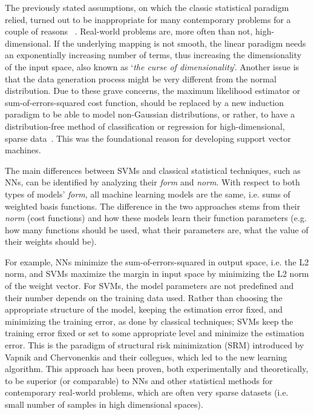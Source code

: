 \documentclass[reqno]{vcuthesis}
\numberwithin{equation}{chapter}
\begin{document}
The previously stated assumptions, on which the classic statistical paradigm relied, turned out to be inappropriate for many contemporary problems for a couple of reasons~\cite{vapnik1997support} . Real-world problems are, more often than not, high-dimensional. If the underlying mapping is not smooth, the linear paradigm needs an exponentially increasing number of terms, thus increasing the dimensionality of the input space, also known as `\textit{the curse of dimensionality}'. Another issue is that the data generation process might be very different from the normal distribution. Due to these grave concerns, the maximum likelihood estimator or sum-of-errors-squared cost function, should be replaced by a new induction paradigm to be able to model non-Gaussian distributions, or rather, to have a distribution-free method of classification or regression for high-dimensional, sparse data~\cite{Kecman2001}. This was the foundational reason for developing support vector machines.

The main differences between SVMs and classical statistical techniques, such as NNs, can be identified by analyzing their \textit{form} and \textit{norm}. With respect to both types of models' \textit{form}, all machine learning models are the same, i.e. sums of weighted basis functions. The difference in the two approaches stems from their \textit{norm} (cost functions) and how these models learn their function parameters (e.g. how many functions should be used, what their parameters are, what the value of their weights should be). 

For example, NNs minimize the sum-of-errors-squared in output space, i.e. the L2 norm, and SVMs maximize the margin in input space by minimizing the L2 norm of the weight vector. For SVMs, the model parameters are not predefined and their number depends on the training data used. Rather than choosing the appropriate structure of the model, keeping the estimation error fixed, and minimizing the training error, as done by classical techniques; SVMs keep the training error fixed or set to some appropriate level and minimize the estimation error. This is the paradigm of structural risk minimization (SRM) introduced by Vapnik and Chervonenkis and their collegues, which led to the new learning algorithm. This approach has been proven, both experimentally and theoretically, to be superior (or comparable) to NNs and other statistical methods for contemporary real-world problems, which are often very sparse datasets (i.e. small number of samples in high dimensional spaces).
\end{document}
